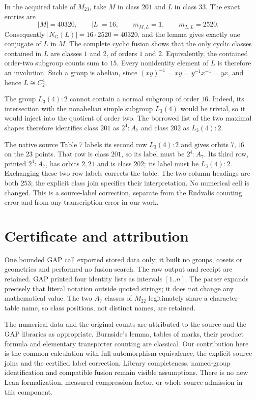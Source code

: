 \documentclass[11pt]{article}
\begin{document}
In the acquired table of $M_{23}$, take $M$ in class $201$ and $L$ in class
$33$. The exact entries are
\[
 |M|=40320,\qquad |L|=16,\qquad m_{M,L}=1,\qquad m_{L,L}=2520.
\]
Consequently $|N_G(L)|=16\cdot2520=40320$, and the lemma gives exactly
one conjugate of $L$ in $M$. The complete cyclic fusion shows that the
only cyclic classes contained in $L$ are classes $1$ and $2$, of orders
$1$ and $2$. Equivalently, the contained order-two subgroup counts sum
to $15$. Every nonidentity element of $L$ is therefore an involution.
Such a group is abelian, since $(xy)^{-1}=xy=y^{-1}x^{-1}=yx$, and hence
$L\cong C_2^4$.

The group $L_3(4):2$ cannot contain a normal subgroup of order $16$.
Indeed, its intersection with the nonabelian simple subgroup $L_3(4)$
would be trivial, so it would inject into the quotient of order two.
The borrowed list of the two maximal shapes therefore identifies class
$201$ as $2^4:A_7$ and class $202$ as $L_3(4):2$.

The native source Table 7 labels its second row $L_3(4):2$ and gives
orbits $7,16$ on the $23$ points. That row is class $201$, so its label
must be $2^4:A_7$. Its third row, printed $2^4:A_7$, has orbits $2,21$
and is class $202$; its label must be $L_3(4):2$. Exchanging these two
row labels corrects the table. The two column headings are both $253$;
the explicit class join specifies their interpretation. No numerical
cell is changed. This is a source-label correction, separate from the
Rudvalis counting error and from any transcription error in our work.

\section{Certificate and attribution}
One bounded GAP call exported stored data only; it built no groups, cosets
or geometries and performed no fusion search. The raw output and receipt
are retained. GAP printed four identity lists as intervals $[1\mathbin{..}n]$.
The parser expands precisely that literal notation outside quoted strings;
it does not change any mathematical value. The two $A_7$ classes of
$M_{22}$ legitimately share a character-table name, so class positions,
not distinct names, are retained.

The numerical data and the original counts are attributed to the source
and the GAP libraries as appropriate. Burnside's lemma, tables of marks,
their product formula and elementary transporter counting are classical.
Our contribution here is the common calculation with full automorphism
equivalence, the explicit source joins and the certified label correction.
Library completeness, named-group identification and compatible fusion
remain visible assumptions. There is no new Lean formalization, measured
compression factor, or whole-source admission in this component.
\end{document}
